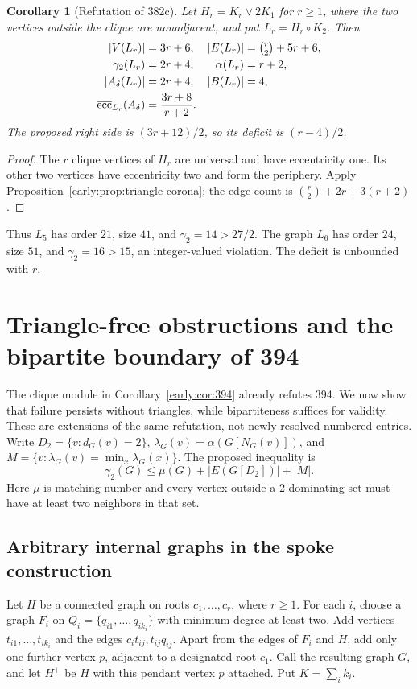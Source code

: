 \documentclass[11pt,a4paper]{article}
\newtheorem{corollary}[theorem]{Corollary}
\theoremstyle{definition}\newtheorem{definition}[theorem]{Definition}
\theoremstyle{remark}\newtheorem{remark}[theorem]{Remark}
\begin{document}
\begin{corollary}[Refutation of 382c]
\label{early:cor:382c}
Let $H_r=K_r\vee 2K_1$ for $r\geq1$, where the two vertices outside
the clique are nonadjacent, and put $L_r=H_r\circ K_2$.  Then
\begin{align*}
 |V(L_r)|&=3r+6,&
 |E(L_r)|&=\tbinom r2+5r+6,\\
 \gamma_2(L_r)&=2r+4,&\alpha(L_r)&=r+2,\\
 |A_\delta(L_r)|&=2r+4,& |B(L_r)|&=4,\\
 \overline{\operatorname{ecc}}_{L_r}(A_\delta)
 &=\frac{3r+8}{r+2}.&&
\end{align*}
The proposed right side is $(3r+12)/2$, so its deficit is $(r-4)/2$.
\end{corollary}
\begin{proof}
The $r$ clique vertices of $H_r$ are universal and have eccentricity
one.  Its other two vertices have eccentricity two and form the
periphery.  Apply Proposition~\ref{early:prop:triangle-corona}; the
edge count is $\binom r2+2r+3(r+2)$.
\end{proof}

Thus $L_5$ has order $21$, size $41$, and
$\gamma_2=14>27/2$.  The graph $L_6$ has order $24$, size $51$, and
$\gamma_2=16>15$, an integer-valued violation.  The deficit is
unbounded with $r$.

\section{Triangle-free obstructions and the bipartite boundary of 394}
\label{r11td:extension}
The clique module in Corollary~\ref{early:cor:394} already refutes 394.
We now show that failure persists without triangles, while bipartiteness
suffices for validity. These are extensions of the same refutation, not
newly resolved numbered entries.
Write $D_2=\{v:d_G(v)=2\}$, $\lambda_G(v)=\alpha(G[N_G(v)])$, and
$M=\{v:\lambda_G(v)=\min_x\lambda_G(x)\}$. The proposed inequality is
\[
 \gamma_2(G)\le \mu(G)+|E(G[D_2])|+|M|.
\]
Here $\mu$ is matching number and every vertex outside a 2-dominating
set must have at least two neighbors in that set.

\subsection{Arbitrary internal graphs in the spoke construction}
Let $H$ be a connected graph on roots $c_1,\ldots,c_r$, where $r\ge1$.
For each $i$, choose a graph $F_i$ on
$Q_i=\{q_{i1},\ldots,q_{ik_i}\}$ with minimum degree at least two.
Add vertices $t_{i1},\ldots,t_{ik_i}$ and the edges
$c_it_{ij},t_{ij}q_{ij}$. Apart from the edges of $F_i$ and $H$, add
only one further vertex $p$, adjacent to a designated root $c_1$.
Call the resulting graph $G$, and let $H^+$ be $H$ with this pendant
vertex $p$ attached. Put $K=\sum_i k_i$.
\end{document}
